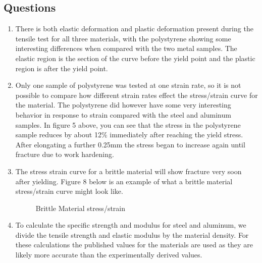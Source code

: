 \documentclass{article}
\begin{document}
\subsection*{Questions}
\begin{enumerate}
\item There is both elastic deformation and plastic deformation present during the tensile test for all three materials, with the polystyrene showing some interesting differences when compared with the two metal samples. The elastic region is the section of the curve before the yield point and the plastic region is after the yield point.

\item Only one sample of polystyrene was tested at one strain rate, so it is not possible to compare how different strain rates effect the stress/strain curve for the material. The polystyrene did however have some very interesting behavior in response to strain compared with the steel and aluminum samples. In figure 5 above, you can see that the stress in the polystyrene sample reduces by about 12\% immediately after reaching the yield stress. After elongating a further 0.25\si{mm} the stress began to increase again until fracture due to work hardening.

\item The stress strain curve for a brittle material will show fracture very soon after yielding. Figure 8 below is an example of what a brittle material stress/strain curve might look like.

\begin{figure}[H]
\begin{center}
	\caption{Brittle Material stress/strain}
	\label{tab:graph4}
\end{center}
\end{figure}

\item To calculate the specific strength and modulus for steel and aluminum, we divide the tensile strength and elastic modulus by the material density. For these calculations the published values for the materials are used as they are likely more accurate than the experimentally derived values.


\end{enumerate}
\end{document}
